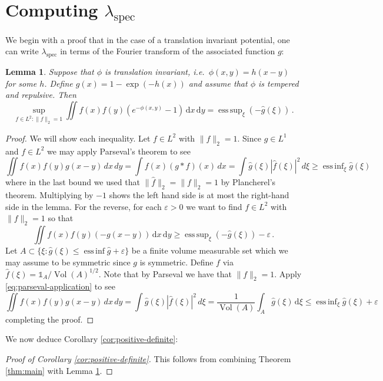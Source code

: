 \documentclass[10pt]{amsart}
\newtheorem{lemma}[theorem]{Lemma}
\theoremstyle{definition}
\theoremstyle{remark}
\DeclareMathOperator*{\essinf}{ess\,inf}
\DeclareMathOperator*{\esssup}{ess\,sup}
\def\eps{{\varepsilon}}
\newcommand{\ind}[1]{\mathds{1}_{#1}}
\newcommand{\spec}{{\mathrm{spec}}}
\newcommand{\Vol}{\operatorname{Vol}}
\newcommand{\diff}{\mathrm{d}}
\begin{document}
	
	\section{Computing \texorpdfstring{$\lambda_\spec$}{lambda-spec}} \label{sec:lambda-spec}
	
	We begin with a proof that in the case of a translation invariant potential, one can write $\lambda_\spec$ in terms of the Fourier transform of the associated function $g$:
	
	\begin{lemma}\label{lem:fourier-criterion}
		Suppose that $\phi$ is translation invariant, i.e.\ $\phi(x,y) = h(x - y)$ for some $h$.  Define $g(x) = 1 - \exp(-h(x))$ and assume that $\phi$ is tempered and repulsive.  Then $$\sup_{f \in L^2 : \|f \|_2 = 1} \iint f(x) f(y) (e^{-\phi(x,y)} - 1)\,\diff x\,\diff y = \esssup_{\xi} (-\widehat{g}(\xi))\,.$$
	\end{lemma}
	\begin{proof}
		We will show each inequality.  Let $f \in L^2$ with $\|f\|_2 = 1$.  Since $g \in L^1$ and $f \in L^2$ we may apply Parseval's theorem to see \begin{equation} \label{eq:parseval-application}
			\iint f(x) f(y)  g(x - y) \,dx\,dy =  \int f(x) (g * f)(x) \,dx =  \int \widehat{g}(\xi) |\widehat{f}(\xi)|^2  \,d\xi \geq  \essinf_\xi \widehat{g}(\xi) 
		\end{equation}
		where in the last bound we used that $\|\widehat{f}\|_2 = \|f \|_2 = 1$ by Plancherel's theorem. Multiplying by $-1$ shows the left hand side is at most the right-hand side in the lemma.  For the reverse, for each $\eps > 0$ we want to find $f \in L^2$ with $\|f \|_2 = 1$ so that $$\iint f(x) f(y) (- g(x - y))\,\diff x\,\diff y \geq \esssup_{\xi}(-\widehat{g}(\xi)) - \eps\,.$$
		Let $A \subset \{\xi : \widehat{g}(\xi) \leq \essinf \widehat{g} + \eps\}$ be a finite volume measurable set which we may assume to be symmetric since $g$ is symmetric.  Define $f$ via $\widehat{f}(\xi) = \ind{A} / \Vol(A)^{1/2}$.  Note that by Parseval we have that $\|f\|_2 = 1$.  Apply \eqref{eq:parseval-application} to see $$\iint f(x) f(y)  g(x - y) \,dx\,dy =  \int \widehat{g}(\xi) |\widehat{f}(\xi)|^2  \,d\xi = \frac{1}{\Vol(A)} \int_A \widehat{g}(\xi)\,\diff \xi \leq \essinf_\xi \widehat{g}(\xi) + \eps$$
		completing the proof.
	\end{proof}
	
	
	We now deduce Corollary \ref{cor:positive-definite}:
	
	\begin{proof}[Proof of Corollary \ref{cor:positive-definite}]
		This follows from combining Theorem \ref{thm:main} with Lemma \ref{lem:fourier-criterion}.
	\end{proof}
	
\end{document}
